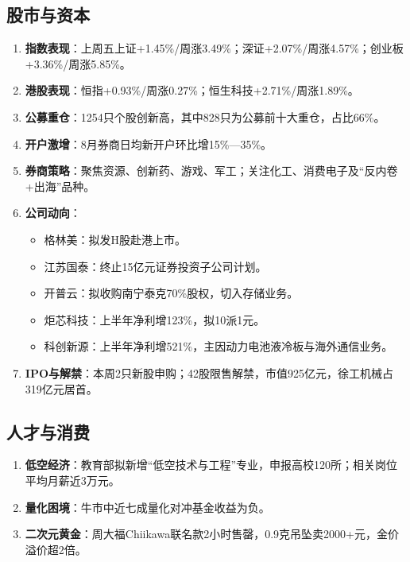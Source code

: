 \subsection{股市与资本}
\begin{enumerate}[leftmargin=*, nosep]
    \item \textbf{指数表现}：上周五上证+1.45\%/周涨3.49\%；深证+2.07\%/周涨4.57\%；创业板+3.36\%/周涨5.85\%。
    \item \textbf{港股表现}：恒指+0.93\%/周涨0.27\%；恒生科技+2.71\%/周涨1.89\%。
    \item \textbf{公募重仓}：1254只个股创新高，其中828只为公募前十大重仓，占比66\%。
    \item \textbf{开户激增}：8月券商日均新开户环比增15\%—35\%。
    \item \textbf{券商策略}：聚焦资源、创新药、游戏、军工；关注化工、消费电子及“反内卷+出海”品种。
    \item \textbf{公司动向}：
        \begin{itemize}[nosep]
            \item 格林美：拟发H股赴港上市。
            \item 江苏国泰：终止15亿元证券投资子公司计划。
            \item 开普云：拟收购南宁泰克70\%股权，切入存储业务。
            \item 炬芯科技：上半年净利增123\%，拟10派1元。
            \item 科创新源：上半年净利增521\%，主因动力电池液冷板与海外通信业务。
        \end{itemize}
    \item \textbf{IPO与解禁}：本周2只新股申购；42股限售解禁，市值925亿元，徐工机械占319亿元居首。
\end{enumerate}

\subsection{人才与消费}
\begin{enumerate}[leftmargin=*, nosep]
    \item \textbf{低空经济}：教育部拟新增“低空技术与工程”专业，申报高校120所；相关岗位平均月薪近3万元。
    \item \textbf{量化困境}：牛市中近七成量化对冲基金收益为负。
    \item \textbf{二次元黄金}：周大福Chiikawa联名款2小时售罄，0.9克吊坠卖2000+元，金价溢价超2倍。
\end{enumerate}

